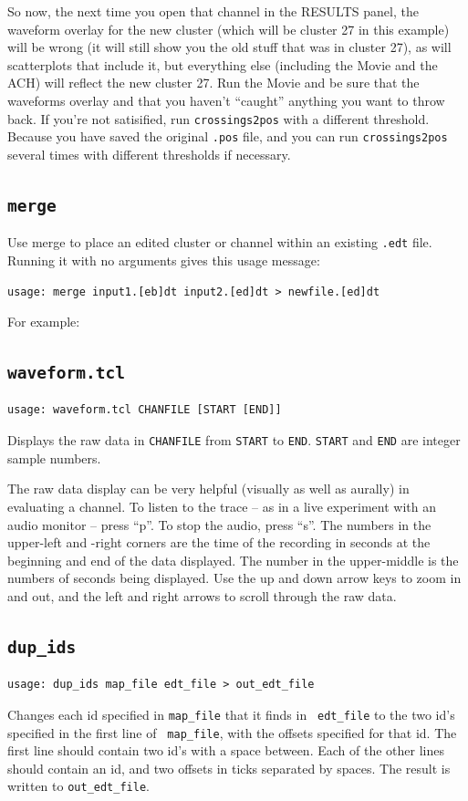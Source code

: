 \documentclass[12pt]{article}
\begin{document}
So now, the next time you open that channel in the {\sf RESULTS}
panel, the waveform overlay for the new cluster (which will be cluster
27 in this example) will be wrong (it will still show you the old
stuff that was in cluster 27), as will scatterplots that include it,
but everything else (including the Movie and the ACH) will reflect the
new cluster 27.  Run the Movie and be sure that the waveforms overlay
and that you haven't ``caught'' anything you want to throw back.  If
you're not satisified, run {\tt crossings2pos} with a different
threshold. Because you have saved the original {\tt .pos} file, and
you can run {\tt crossings2pos} several times with different
thresholds if necessary.

\subsection{\tt merge}
\label{merge}
Use merge to place an edited cluster or channel within an existing
{\tt .edt} file. Running it with no arguments gives this usage
message:
\begin{verbatim}
usage: merge input1.[eb]dt input2.[ed]dt > newfile.[ed]dt
\end{verbatim}
For example:


\subsection{\tt waveform.tcl}
\label{wave}
\begin{verbatim}
usage: waveform.tcl CHANFILE [START [END]]
\end{verbatim}
Displays the raw data in {\tt CHANFILE} from {\tt START} to {\tt END}.
{\tt START} and {\tt END} are integer sample numbers.

The raw data display can be very helpful (visually as well as aurally)
in evaluating a channel.  To listen to the trace -- as in a live
experiment with an audio monitor -- press ``p''. To stop the audio,
press ``s''.  The numbers in the upper-left and -right corners are the
time of the recording in seconds at the beginning and end of the data
displayed. The number in the upper-middle is the numbers of seconds
being displayed. Use the up and down arrow keys to zoom in and out,
and the left and right arrows to scroll through the raw data.

\subsection{\tt dup\_ids}
\label{dup}
\begin{verbatim}
usage: dup_ids map_file edt_file > out_edt_file
\end{verbatim}
Changes each id specified in {\tt map\_file} that it finds in {\tt
  edt\_file} to the two id's specified in the first line of {\tt
  map\_file}, with the offsets specified for that id.  The first line
should contain two id's with a space between.  Each of the other lines
should contain an id, and two offsets in ticks separated by spaces.
The result is written to {\tt out\_edt\_file}.
\end{document}
